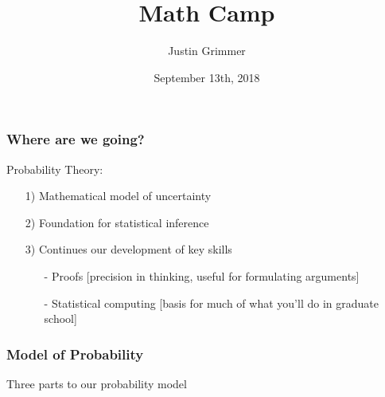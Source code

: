 \documentclass{beamer}
\title[Methodology I] %
{Math Camp}
\author{Justin Grimmer}
\institute[Stanford University]{Professor\\Department of Political Science \\  Stanford University}
\date{September 13th, 2018}
\numberwithin{equation}{section}
\begin{document}
\begin{frame}
\maketitle
\end{frame}







\begin{frame}
\frametitle{Where are we going?}

Probability Theory:
\begin{itemize}
\item[1)] Mathematical model of uncertainty
\item[2)] Foundation for statistical inference 
\item[3)] Continues our development of key skills
\begin{itemize}
\item[-] Proofs [precision in thinking, useful for formulating arguments]
\item[-] Statistical computing [basis for much of what you'll do in graduate school]
\end{itemize}
\end{itemize}


\end{frame}



\begin{frame}
\frametitle{Model of Probability}

Three parts to our probability model \pause 
\begin{itemize}
 \pause 
{} \pause 
{} 
\end{itemize}
\end{frame}
\end{document}
